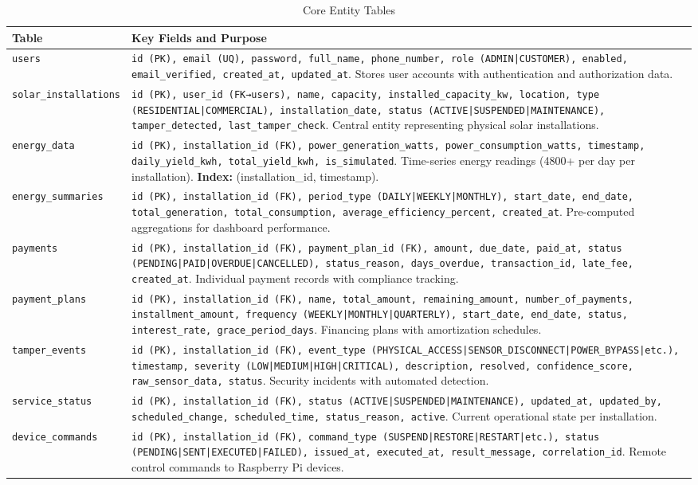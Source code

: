 \begin{table}[htbp]
\centering
\caption{Core Entity Tables}
\label{tab:core-entities}
\small
\begin{tabular}{|p{3.5cm}|p{9cm}|}
\hline
\textbf{Table} & \textbf{Key Fields and Purpose} \\
\hline
\texttt{users} & \texttt{id (PK), email (UQ), password, full\_name, phone\_number, role (ADMIN|CUSTOMER), enabled, email\_verified, created\_at, updated\_at}. Stores user accounts with authentication and authorization data. \\
\hline
\texttt{solar\_installations} & \texttt{id (PK), user\_id (FK→users), name, capacity, installed\_capacity\_kw, location, type (RESIDENTIAL|COMMERCIAL), installation\_date, status (ACTIVE|SUSPENDED|MAINTENANCE), tamper\_detected, last\_tamper\_check}. Central entity representing physical solar installations. \\
\hline
\texttt{energy\_data} & \texttt{id (PK), installation\_id (FK), power\_generation\_watts, power\_consumption\_watts, timestamp, daily\_yield\_kwh, total\_yield\_kwh, is\_simulated}. Time-series energy readings (4800+ per day per installation). \textbf{Index:} (installation\_id, timestamp). \\
\hline
\texttt{energy\_summaries} & \texttt{id (PK), installation\_id (FK), period\_type (DAILY|WEEKLY|MONTHLY), start\_date, end\_date, total\_generation, total\_consumption, average\_efficiency\_percent, created\_at}. Pre-computed aggregations for dashboard performance. \\
\hline
\texttt{payments} & \texttt{id (PK), installation\_id (FK), payment\_plan\_id (FK), amount, due\_date, paid\_at, status (PENDING|PAID|OVERDUE|CANCELLED), status\_reason, days\_overdue, transaction\_id, late\_fee, created\_at}. Individual payment records with compliance tracking. \\
\hline
\texttt{payment\_plans} & \texttt{id (PK), installation\_id (FK), name, total\_amount, remaining\_amount, number\_of\_payments, installment\_amount, frequency (WEEKLY|MONTHLY|QUARTERLY), start\_date, end\_date, status, interest\_rate, grace\_period\_days}. Financing plans with amortization schedules. \\
\hline
\texttt{tamper\_events} & \texttt{id (PK), installation\_id (FK), event\_type (PHYSICAL\_ACCESS|SENSOR\_DISCONNECT|POWER\_BYPASS|etc.), timestamp, severity (LOW|MEDIUM|HIGH|CRITICAL), description, resolved, confidence\_score, raw\_sensor\_data, status}. Security incidents with automated detection. \\
\hline
\texttt{service\_status} & \texttt{id (PK), installation\_id (FK), status (ACTIVE|SUSPENDED|MAINTENANCE), updated\_at, updated\_by, scheduled\_change, scheduled\_time, status\_reason, active}. Current operational state per installation. \\
\hline
\texttt{device\_commands} & \texttt{id (PK), installation\_id (FK), command\_type (SUSPEND|RESTORE|RESTART|etc.), status (PENDING|SENT|EXECUTED|FAILED), issued\_at, executed\_at, result\_message, correlation\_id}. Remote control commands to Raspberry Pi devices. \\
\hline
\end{tabular}
\end{table}

